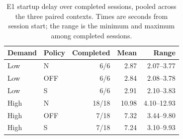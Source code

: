 \begin{table}[ht]
\centering\small
\caption{E1 startup delay over completed sessions, pooled across the
three paired contexts. Times are seconds from session start; the
range is the minimum and maximum among completed sessions.}
\label{tab:e1-startup}
\begin{tabular}{@{}llrrr@{}}
\toprule
Demand & Policy & Completed & Mean & Range \\
\midrule
Low & N & 6/6 & 2.87 & 2.07--3.77 \\
Low & OFF & 6/6 & 2.84 & 2.08--3.78 \\
Low & S & 6/6 & 2.91 & 2.10--3.83 \\
High & N & 18/18 & 10.98 & 4.10--12.93 \\
High & OFF & 7/18 & 7.32 & 3.44--9.80 \\
High & S & 7/18 & 7.24 & 3.10--9.93 \\
\bottomrule
\end{tabular}
\end{table}
